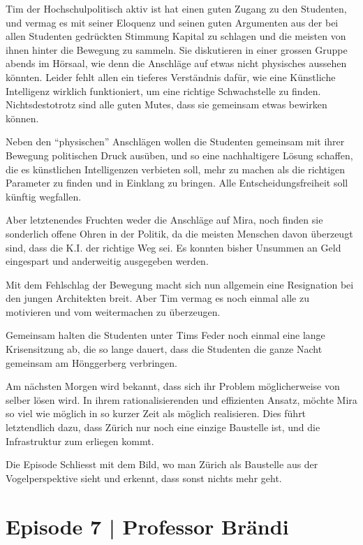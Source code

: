 \documentclass[11pt,a4paper,ngerman]{scrreprt}
\begin{document}
Tim der Hochschulpolitisch aktiv ist hat einen guten Zugang zu den Studenten,
und vermag es mit seiner Eloquenz und seinen guten Argumenten aus der bei
allen Studenten gedrückten Stimmung Kapital zu schlagen und die meisten von
ihnen hinter die Bewegung zu sammeln. Sie diskutieren in einer grossen Gruppe
abends im Hörsaal, wie denn die Anschläge auf etwas nicht physisches aussehen
könnten. Leider fehlt allen ein tieferes Verständnis dafür, wie eine
Künstliche Intelligenz wirklich funktioniert, um eine richtige Schwachstelle
zu finden. Nichtsdestotrotz sind alle guten Mutes, dass sie gemeinsam etwas
bewirken können.

Neben den ``physischen'' Anschlägen wollen die Studenten gemeinsam mit ihrer
Bewegung politischen Druck ausüben, und so eine nachhaltigere Lösung
schaffen, die es künstlichen Intelligenzen verbieten soll, mehr zu machen als
die richtigen Parameter zu finden und in Einklang zu bringen. Alle
Entscheidungsfreiheit soll künftig wegfallen.

Aber letztenendes Fruchten weder die Anschläge auf Mira, noch finden sie
sonderlich offene Ohren in der Politik, da die meisten Menschen davon
überzeugt sind, dass die K.I. der richtige Weg sei. Es konnten bisher
Unsummen an Geld eingespart und anderweitig ausgegeben werden.

Mit dem Fehlschlag der Bewegung macht sich nun allgemein eine Resignation bei
den jungen Architekten breit. Aber Tim vermag es noch einmal alle zu
motivieren und vom weitermachen zu überzeugen.

Gemeinsam halten die Studenten unter Tims Feder noch einmal eine lange
Krisensitzung ab, die so lange dauert, dass die Studenten die ganze Nacht
gemeinsam am Hönggerberg verbringen.

Am nächsten Morgen wird bekannt, dass sich ihr Problem möglicherweise von
selber lösen wird. In ihrem rationalisierenden und effizienten Ansatz, möchte
Mira so viel wie möglich in so kurzer Zeit als möglich realisieren. Dies
führt letztendlich dazu, dass Zürich nur noch eine einzige Baustelle ist, und
die Infrastruktur zum erliegen kommt.

Die Episode Schliesst mit dem Bild, wo man Zürich als Baustelle aus der
Vogelperspektive sieht und erkennt, dass sonst nichts mehr geht.

\section*{Episode 7 | Professor Brändi}
\end{document}
